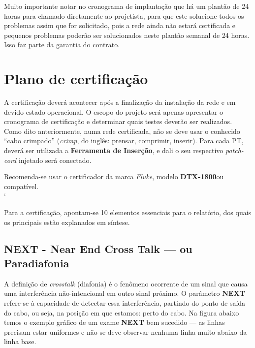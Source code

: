 \documentclass[	DIV=calc,%
							paper=a4,%
							fontsize=12pt,%
							onecolumn]{scrartcl}	 					%
\begin{document}
Muito importante notar no cronograma de implantação que há um plantão de 24 horas para chamado diretamente ao projetista, para que este solucione todos os problemas assim que for solicitado, pois a rede ainda não estará certificada e  pequenos problemas poderão ser solucionados neste plantão semanal de 24 horas. Isso faz parte da garantia do contrato.


 


\section{Plano de certificação}

A certificação deverá acontecer após a finalização da instalação da rede e em devido estado operacional. O escopo do projeto será apenas apresentar o cronograma de certificação e determinar quais testes deverão ser realizados.
\\

Como dito anteriormente, numa rede certificada, não se deve usar o conhecido ``cabo crimpado'' (\textit{crimp}, do inglês: prensar, comprimir, inserir). Para cada PT, deverá ser utilizada a \textbf{Ferramenta de Inserção}, e dali o seu respectivo \textit{patch-cord} injetado será conectado.

Recomenda-se usar o certificador da marca \textit{Fluke}, modelo \textbf{DTX-1800}ou compatível.
\\`

Para a certificação, apontam-se 10 elementos essenciais para o relatório, dos quais os principais estão explanados em síntese.
\\
\subsection{NEXT - Near End Cross Talk --- ou Paradiafonia}
A definição de \textit{crosstalk} (diafonia) é o fenômeno ocorrente de um sinal que causa uma interferência não-intencional em outro sinal próximo. O parâmetro \textbf{NEXT} refere-se à capacidade de detectar essa interferência, partindo do ponto de saída do cabo, ou seja, na posição em que estamos: perto do cabo. Na figura abaixo temos o exemplo gráfico de um exame \textbf{NEXT} bem sucedido --- as linhas precisam estar uniformes e não se deve observar nenhuma linha muito abaixo da linha base.
\end{document}
